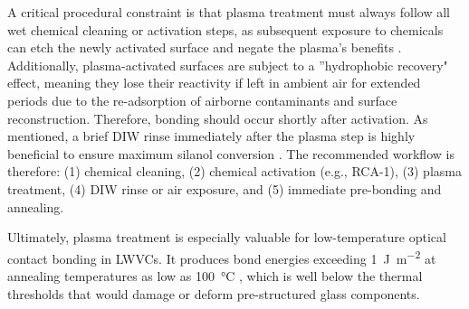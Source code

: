 A critical procedural constraint is that plasma treatment must always follow all wet 
chemical cleaning or activation steps, as subsequent exposure to chemicals can etch 
the newly activated surface and negate the plasma's benefits \cite{neumann2021}. 
Additionally, plasma-activated surfaces are subject to a ''hydrophobic recovery" effect, 
meaning they lose their reactivity if left in ambient air for extended periods due to 
the re-adsorption of airborne contaminants and surface reconstruction. Therefore, 
bonding should occur shortly after activation. As mentioned, a brief DIW rinse 
immediately after the plasma step is highly beneficial to ensure maximum silanol 
conversion \cite{yu2023}. The recommended workflow is therefore: (1) chemical cleaning, 
(2) chemical activation (e.g., RCA-1), (3) plasma treatment, (4) DIW rinse or air exposure, and 
(5) immediate pre-bonding and annealing.

Ultimately, plasma treatment is especially valuable for low-temperature optical contact 
bonding in LWVCs. It produces bond energies exceeding \SI{1}{\joule\per\meter\squared} 
at annealing temperatures as low as \SI{100}{\celsius} \cite{eichler2008, yu2023}, 
which is well below the thermal thresholds that would damage or deform pre-structured 
glass components.